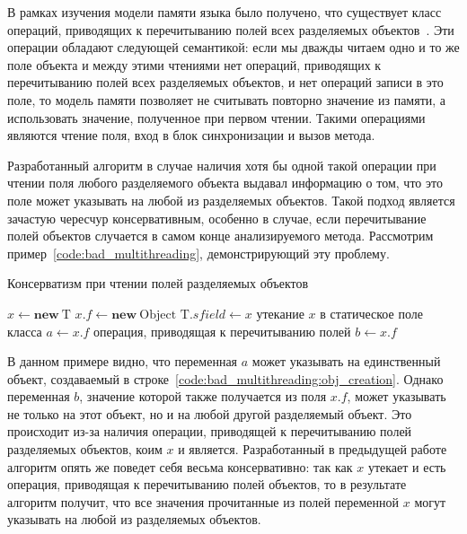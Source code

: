 \documentclass[14pt,titlepage,draft]{extarticle}
\newcommand{\java}{\eng{Java}\xspace}
\newcommand{\type}[1]{\mathrm{#1}}
\newcommand{\op}[1]{\mathbf{#1}}
\begin{document}
      В рамках изучения модели памяти языка \java было получено, что существует
      класс операций, приводящих к перечитыванию полей всех разделяемых
      объектов~\cite[раздел~5.3.1]{my_bachelor}. Эти операции обладают
      следующей семантикой: если мы дважды читаем одно и то же поле объекта и
      между этими чтениями нет операций, приводящих к перечитыванию полей всех
      разделяемых объектов, и нет операций записи в это поле, то модель памяти
      позволяет не считывать повторно значение из памяти, а использовать
      значение, полученное при первом чтении. Такими операциями являются
      чтение  поля, вход в блок синхронизации и вызов метода.

      Разработанный алгоритм в случае наличия хотя бы одной такой операции при
      чтении поля любого разделяемого объекта выдавал информацию о том, что это
      поле может указывать на любой из разделяемых объектов. Такой подход
      является зачастую чересчур консервативным, особенно в случае, если
      перечитывание полей объектов случается в самом конце анализируемого
      метода. Рассмотрим пример~\ref{code:bad_multithreading}, демонстрирующий
      эту проблему.

      \begin{algorithm}
        \caption{Консерватизм при чтении полей разделяемых объектов}
        \label{code:bad_multithreading}
        \begin{algorithmic}[1]
          \State $x \gets \op{new}~\type{T}$
          \State $x.f \gets \op{new}~\type{Object}$
            \label{code:bad_multithreading:obj_creation}
          \State $\type{T}.sfield \gets x$
            \Comment утекание $x$ в статическое поле класса
          \State $a \gets x.f$
          \State {}
            \Comment операция, приводящая к перечитыванию полей
          \State $b \gets x.f$
        \end{algorithmic}
      \end{algorithm}

      В данном примере видно, что переменная $a$ может указывать на
      единственный объект, создаваемый в
      строке~\ref{code:bad_multithreading:obj_creation}. Однако переменная $b$,
      значение которой также получается из поля $x.f$, может указывать не
      только на этот объект, но и на любой другой разделяемый объект. Это
      происходит из-за наличия операции, приводящей к перечитыванию полей
      разделяемых объектов, коим $x$ и является. Разработанный в предыдущей
      работе алгоритм опять же поведет себя весьма консервативно: так как $x$
      утекает и есть операция, приводящая к перечитыванию полей объектов, то
      в результате алгоритм получит, что все значения прочитанные из полей
      переменной $x$ могут указывать на любой из разделяемых объектов.
\end{document}
